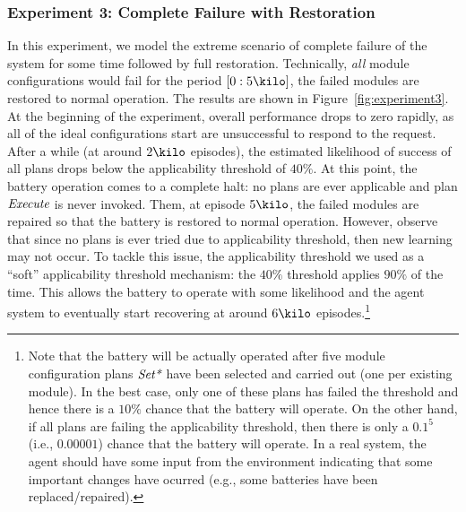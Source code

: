 %

\subsubsection{Experiment 3: Complete Failure with Restoration}

In this experiment, we model the extreme scenario of complete failure of the system for some time followed by full restoration. 
Technically, \emph{all} module configurations would fail for the period $[0:5\kilo]$, the failed modules are restored to normal operation.  
The results are shown in Figure~\ref{fig:experiment3}. 
At the beginning of the experiment, overall performance drops to zero rapidly, as all of the ideal configurations start are unsuccessful to respond to the request. After a while (at around $2\kilo$ episodes), the estimated likelihood of success of all plans drops below the applicability threshold of $40\%$. At this point, the battery operation comes to a complete halt: no plans are ever applicable and plan $\operatorname{\textit{Execute}}$ is never invoked. 
Them, at episode $5\kilo$, the failed modules are repaired so that the battery is restored to normal operation. However, observe that since no plans is ever tried due to applicability threshold, then new learning may not occur. To tackle this issue, the applicability threshold we used as a ``soft'' applicability threshold mechanism: the $40\%$ threshold applies $90\%$ of the time. This allows the battery to operate with some likelihood and the agent system to eventually start recovering at around $6\kilo$ episodes.\footnote{Note that the battery will be actually operated after five module configuration plans $\operatorname{\textit{Set*}}$ have been selected and carried out (one per existing module). In the best case, only one of these plans has failed the threshold and hence there is a $10\%$ chance that the battery will operate. On the other hand, if all plans are failing the applicability threshold, then there is only a $0.1^5$ (i.e.,  $0.00001$) chance that the battery will operate. In a real system, the agent should have some input from the environment indicating that some important changes have ocurred (e.g., some batteries have been replaced/repaired).}




